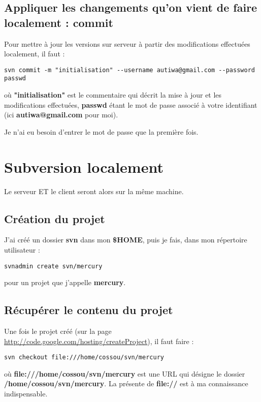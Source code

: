 \documentclass[a4paper,twoside]{article}
\begin{document}
\subsection{Appliquer les changements qu'on vient de faire localement : commit}\label{sec:commit}

Pour mettre à jour les versions sur serveur à partir des modifications effectuées localement, il faut : 
\begin{verbatim}
svn commit -m "initialisation" --username autiwa@gmail.com --password passwd
\end{verbatim}
où \textbf{"initialisation"} est le commentaire qui décrit la mise à jour et les modifications effectuées, \textbf{passwd} étant le mot de passe associé à votre identifiant (ici \textbf{autiwa@gmail.com} pour moi).

\begin{remarque}
Je n'ai eu besoin d'entrer le mot de passe que la première fois.
\end{remarque}

\section{Subversion localement}
Le serveur ET le client seront alors sur la même machine.

\subsection{Création du projet}
J'ai créé un dossier \textbf{svn} dans mon \textbf{\$HOME}, puis je fais, dans mon répertoire utilisateur : 
\begin{verbatim}
svnadmin create svn/mercury
\end{verbatim}
pour un projet que j'appelle \textbf{mercury}.

\subsection{Récupérer le contenu du projet}
Une fois le projet créé (sur la page \url{http://code.google.com/hosting/createProject}), il faut faire : 
\begin{verbatim}
svn checkout file:///home/cossou/svn/mercury
\end{verbatim}
où \textbf{file:///home/cossou/svn/mercury} est une URL qui désigne le dossier \textbf{/home/cossou/svn/mercury}. La présente de \textbf{file://} est à ma connaissance indispensable.
\end{document}
